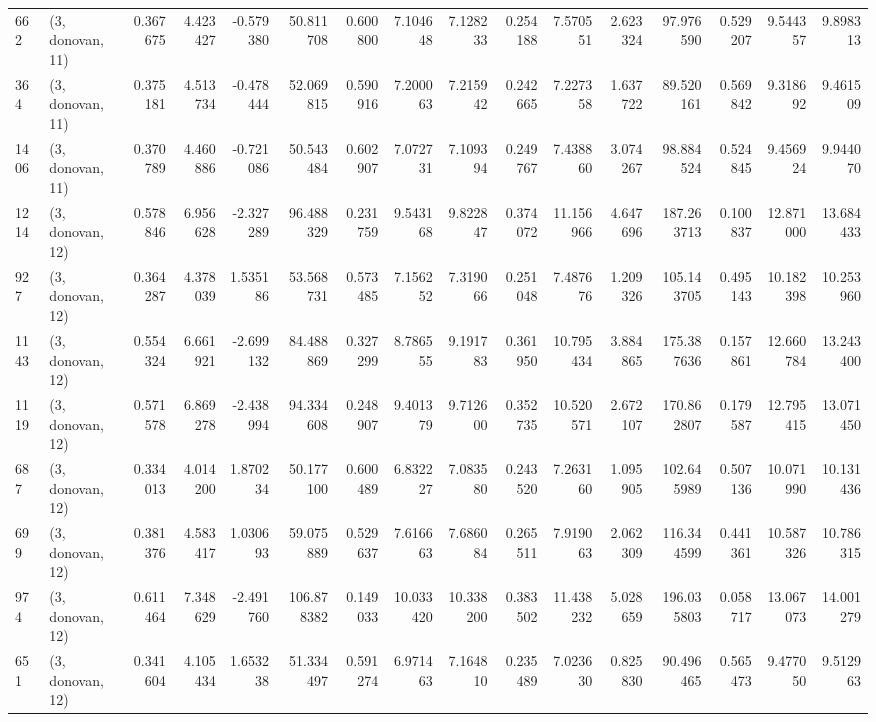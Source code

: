 \begin{tabular}{llrrrrrrrrrrrrrr}
662  &  (3, donovan, 11) &   0.367675 &   4.423427 &  -0.579380 &     50.811708 &    0.600800 &    7.104648 &    7.128233 &  0.254188 &   7.570551 &   2.623324 &    97.976590 &   0.529207 &   9.544357 &   9.898313 \\
364  &  (3, donovan, 11) &   0.375181 &   4.513734 &  -0.478444 &     52.069815 &    0.590916 &    7.200063 &    7.215942 &  0.242665 &   7.227358 &   1.637722 &    89.520161 &   0.569842 &   9.318692 &   9.461509 \\
1406 &  (3, donovan, 11) &   0.370789 &   4.460886 &  -0.721086 &     50.543484 &    0.602907 &    7.072731 &    7.109394 &  0.249767 &   7.438860 &   3.074267 &    98.884524 &   0.524845 &   9.456924 &   9.944070 \\
1214 &  (3, donovan, 12) &   0.578846 &   6.956628 &  -2.327289 &     96.488329 &    0.231759 &    9.543168 &    9.822847 &  0.374072 &  11.156966 &   4.647696 &   187.263713 &   0.100837 &  12.871000 &  13.684433 \\
927  &  (3, donovan, 12) &   0.364287 &   4.378039 &   1.535186 &     53.568731 &    0.573485 &    7.156252 &    7.319066 &  0.251048 &   7.487676 &   1.209326 &   105.143705 &   0.495143 &  10.182398 &  10.253960 \\
1143 &  (3, donovan, 12) &   0.554324 &   6.661921 &  -2.699132 &     84.488869 &    0.327299 &    8.786555 &    9.191783 &  0.361950 &  10.795434 &   3.884865 &   175.387636 &   0.157861 &  12.660784 &  13.243400 \\
1119 &  (3, donovan, 12) &   0.571578 &   6.869278 &  -2.438994 &     94.334608 &    0.248907 &    9.401379 &    9.712600 &  0.352735 &  10.520571 &   2.672107 &   170.862807 &   0.179587 &  12.795415 &  13.071450 \\
687  &  (3, donovan, 12) &   0.334013 &   4.014200 &   1.870234 &     50.177100 &    0.600489 &    6.832227 &    7.083580 &  0.243520 &   7.263160 &   1.095905 &   102.645989 &   0.507136 &  10.071990 &  10.131436 \\
699  &  (3, donovan, 12) &   0.381376 &   4.583417 &   1.030693 &     59.075889 &    0.529637 &    7.616663 &    7.686084 &  0.265511 &   7.919063 &   2.062309 &   116.344599 &   0.441361 &  10.587326 &  10.786315 \\
974  &  (3, donovan, 12) &   0.611464 &   7.348629 &  -2.491760 &    106.878382 &    0.149033 &   10.033420 &   10.338200 &  0.383502 &  11.438232 &   5.028659 &   196.035803 &   0.058717 &  13.067073 &  14.001279 \\
651  &  (3, donovan, 12) &   0.341604 &   4.105434 &   1.653238 &     51.334497 &    0.591274 &    6.971463 &    7.164810 &  0.235489 &   7.023630 &   0.825830 &    90.496465 &   0.565473 &   9.477050 &   9.512963 \\

\end{tabular}

